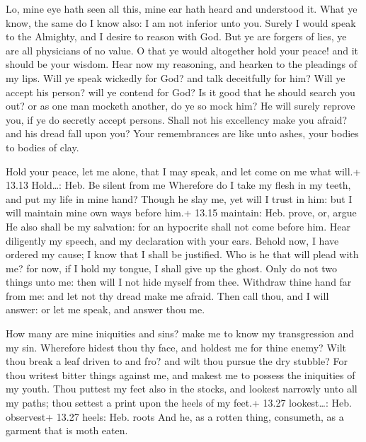  Lo, mine eye hath seen all this, mine ear hath heard and
understood it.  What ye know, the same do I know also: I am
not inferior unto you.  Surely I would speak to the
Almighty, and I desire to reason with God.  But ye are
forgers of lies, ye are all physicians of no value.  O that
ye would altogether hold your peace! and it should be your wisdom.
 Hear now my reasoning, and hearken to the pleadings of my
lips.  Will ye speak wickedly for God? and talk deceitfully
for him?  Will ye accept his person? will ye contend for
God?  Is it good that he should search you out? or as one
man mocketh another, do ye so mock him?  He will surely
reprove you, if ye do secretly accept persons.  Shall not
his excellency make you afraid? and his dread fall upon you?
 Your remembrances are like unto ashes, your bodies to
bodies of clay.

 Hold your peace, let me alone, that I may speak, and let
come on me what will.+ 13.13 Hold\ldots: Heb. Be silent from me
 Wherefore do I take my flesh in my teeth, and put my life
in mine hand?  Though he slay me, yet will I trust in him:
but I will maintain mine own ways before him.+ 13.15 maintain: Heb.
prove, or, argue  He also shall be my salvation: for an
hypocrite shall not come before him.  Hear diligently my
speech, and my declaration with your ears.  Behold now, I
have ordered my cause; I know that I shall be justified. 
Who is he that will plead with me? for now, if I hold my tongue, I shall
give up the ghost.  Only do not two things unto me: then
will I not hide myself from thee.  Withdraw thine hand far
from me: and let not thy dread make me afraid.  Then call
thou, and I will answer: or let me speak, and answer thou me.

 How many are mine iniquities and sins? make me to know my
transgression and my sin.  Wherefore hidest thou thy face,
and holdest me for thine enemy?  Wilt thou break a leaf
driven to and fro? and wilt thou pursue the dry stubble? 
For thou writest bitter things against me, and makest me to possess the
iniquities of my youth.  Thou puttest my feet also in the
stocks, and lookest narrowly unto all my paths; thou settest a print
upon the heels of my feet.+ 13.27 lookest\ldots: Heb. observest+ 13.27
heels: Heb. roots  And he, as a rotten thing, consumeth, as
a garment that is moth eaten.

